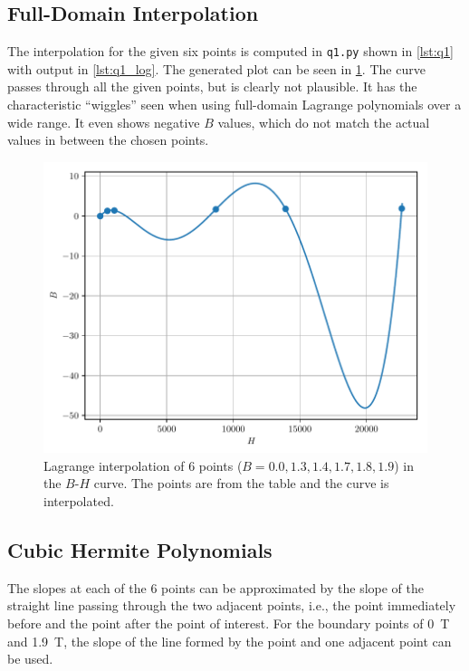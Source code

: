 \documentclass[a4paper,titlepage]{article}
\newcommand{\code}[1]{\texttt{#1}}
\begin{document}
	\subsection{Full-Domain Interpolation}	
	
	The interpolation for the given six points is computed in \code{q1.py} shown in \cref{lst:q1} with output in \cref{lst:q1_log}. The generated plot can be seen in \cref{fig:q1b}. The curve passes through all the given points, but is clearly not plausible. It has the characteristic ``wiggles'' seen when using full-domain Lagrange polynomials over a wide range. It even shows negative $B$ values, which do not match the actual values in between the chosen points.
	
	\begin{figure}[!htb]
		\centering
		\includegraphics[width=\columnwidth]{plots/q1b.pdf}
		\caption
		{Lagrange interpolation of 6 points ($B = 0.0, 1.3, 1.4, 1.7, 1.8, 1.9$) in the $B$-$H$ curve. The points are from the table and the curve is interpolated.}
		\label{fig:q1b}
	\end{figure}
	
	\subsection{Cubic Hermite Polynomials}
	The slopes at each of the 6 points can be approximated by the slope of the straight line passing through the two adjacent points, i.e., the point immediately before and the point after the point of interest. For the boundary points of \SI{0}{\tesla} and \SI{1.9}{\tesla}, the slope of the line formed by the point and one adjacent point can be used.
	
\end{document}
